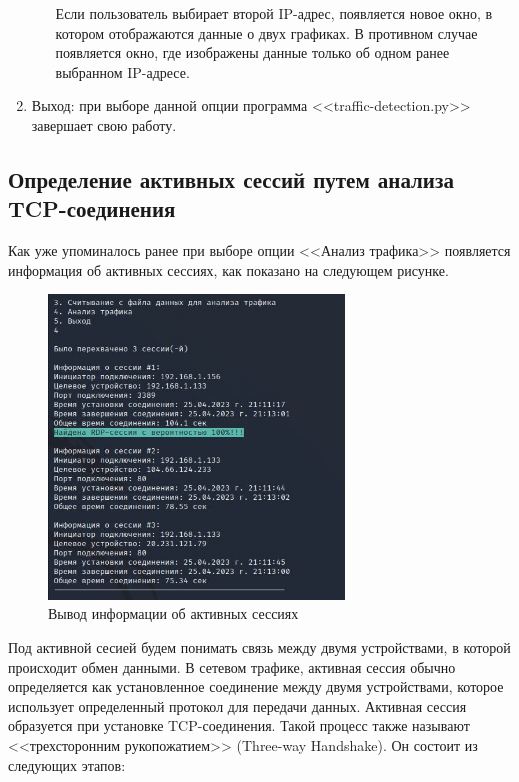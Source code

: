 \documentclass[bachelor, och, coursework]{SCWorks}
\begin{document}
\begin{enumerate}
\begin{enumerate}
    Если пользователь выбирает второй IP-адрес, появляется новое окно, в котором отображаются данные о двух графиках.
    В противном случае появляется окно, где изображены данные только об одном ранее выбранном IP-адресе. 

  \end{enumerate}


  \item Выход: при выборе данной опции программа <<traffic-detection.py>> завершает свою работу.
\end{enumerate}

\subsection{Определение активных сессий путем анализа TCP-соединения}

Как уже упоминалось ранее при выборе опции <<Анализ трафика>> появляется информация об активных сессиях, как показано на следующем рисунке.

\begin{figure}[H]
  \centering
  \includegraphics[width=0.7\textwidth]{photo/cmd-activeses.jpg}
  \caption{Вывод информации об активных сессиях}
  \label{cmd-activeses}
\end{figure}

Под активной сесией будем понимать связь между двумя устройствами, в которой происходит обмен данными. В сетевом трафике, активная сессия 
обычно определяется как установленное соединение между двумя устройствами, которое использует определенный протокол для передачи данных.
Активная сессия образуется при установке TCP-соединения. Такой процесс также называют <<трехсторонним рукопожатием>> (Three-way Handshake). Он состоит 
из следующих этапов:
\end{document}
